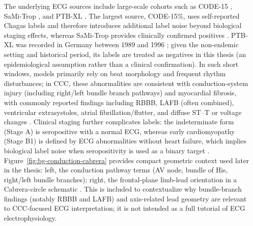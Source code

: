 The underlying ECG sources include large-scale cohorts such as CODE-15 \parencite{ribeiro_code-15_2021}, SaMi-Trop \parencite{ribeiro_sami-trop_2021}, and PTB-XL \parencite{wagner_ptb_xl}.
The largest source, CODE-15\%, uses self-reported Chagas labels and therefore introduces additional label noise beyond biological staging effects, whereas SaMi-Trop provides clinically confirmed positives \parencite{ribeiro_code-15_2021,ribeiro_sami-trop_2021}.
PTB-XL was recorded in Germany between 1989 and 1996 \parencite{wagner_ptb_xl}; given the non-endemic setting and historical period, its labels are treated as negatives in this thesis (an epidemiological assumption rather than a clinical confirmation).
In such short windows, models primarily rely on beat morphology and frequent rhythm disturbances; in CCC, these abnormalities are consistent with conduction-system injury (including right/left bundle branch pathways) and myocardial fibrosis, with commonly reported findings including RBBB, LAFB (often combined), ventricular extrasystoles, atrial fibrillation/flutter, and diffuse ST--T or voltage changes \parencite{chagas_ecg_abnormalities_2018,lancet_clinical_chagas_features_2024}.
Clinical staging further complicates labels: the indeterminate form (Stage A) is seropositive with a normal ECG, whereas early cardiomyopathy (Stage B1) is defined by ECG abnormalities without heart failure, which implies biological label noise when seropositivity is used as a binary target \parencite{chagas_progression_2022,lancet_clinical_chagas_features_2024}.
Figure~\ref{fig:bg-conduction-cabrera} provides compact geometric context used later in the thesis: left, the conduction pathway terms (AV node, bundle of His, right/left bundle branches); right, the frontal-plane limb-lead orientation in a Cabrera-circle schematic \parencite{SchusterTrappe2024EKGKurs}.
This is included to contextualize why bundle-branch findings (notably RBBB and LAFB) and axis-related lead geometry are relevant to CCC-focused ECG interpretation; it is not intended as a full tutorial of ECG electrophysiology.

